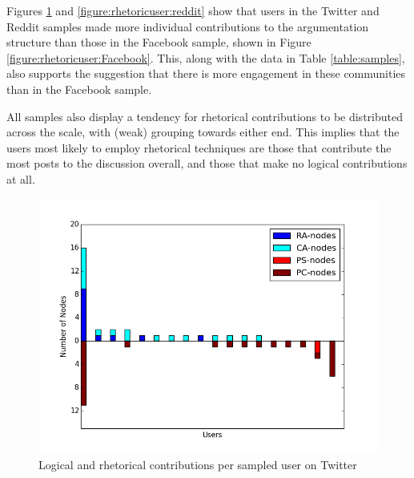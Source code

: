 Figures \ref{figure:rhetoricuser:Twitter} and \ref{figure:rhetoricuser:reddit} show that users in the Twitter and Reddit samples made more individual contributions to the argumentation structure than those in the Facebook sample, shown in Figure \ref{figure:rhetoricuser:Facebook}. This, along with the data in Table \ref{table:samples}, also supports the suggestion that there is more engagement in these communities than in the Facebook sample.

All samples also display a tendency for rhetorical contributions to be distributed across the scale, with (weak) grouping towards either end. 
This implies that the users most likely to employ rhetorical techniques are those that contribute the most posts to the discussion overall, and those that make no logical contributions at all.

\begin{figure}
\centering
\includegraphics[scale=\scaleResults]{./figures/rhetoric_per_user/twitter.png}
\caption{Logical and rhetorical contributions per sampled user on Twitter}
\label{figure:rhetoricuser:Twitter}
\end{figure}

